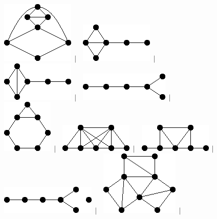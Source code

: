 \documentclass[11pt,paper=b5,footinclude,headinclude]{scrbook} %
\newtheorem{ex}{Vaja\hypertarget{sol:\theex}}[chapter]
\begin{document}
\begin{ex}
\begin{figure}
\includegraphics[scale=0.5]{smallGraphs/g_X17.png}$\,\mid\,$\
\includegraphics[scale=0.5]{smallGraphs/g_X170.png}$\,\mid\,$\
\includegraphics[scale=0.5]{smallGraphs/g_X171.png}$\,\mid\,$\
\includegraphics[scale=0.5]{smallGraphs/g_X172.png}$\,\mid\,$\
\includegraphics[scale=0.5]{smallGraphs/g_X173.png}$\,\mid\,$\
\includegraphics[scale=0.5]{smallGraphs/g_X175.png}$\,\mid\,$\
\includegraphics[scale=0.5]{smallGraphs/g_X176.png}$\,\mid\,$\
\includegraphics[scale=0.5]{smallGraphs/g_X177.png}$\,\mid\,$\
\includegraphics[scale=0.5]{smallGraphs/g_X179.png}$\,\mid\,$\

\end{figure}
\end{ex}
\end{document}
